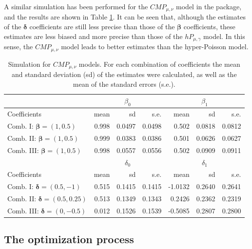 A similar simulation has been performed for the $CMP_{\mu, \nu}$ model in the  package, and the results are shown in Table \ref{tab_simulation_cmp}. It can be seen that, although the estimates of the $\boldsymbol{\delta}$ coefficients are still less precise than those of the $\boldsymbol{\beta}$ coefficients, these estimates are less biased and more precise than those of the $hP_{\mu, \gamma}$ model. In this sense, the $CMP_{\mu, \nu}$ model leads to better estimates than the hyper-Poisson model.

\begin{table}[ht]
\centering
\begin{tabular}{lrrrrrr}
\toprule
  & \multicolumn{3}{c}{$\beta_0$} & \multicolumn{3}{c}{$\beta_1$} \\
  \midrule
  Coefficients & mean & sd & s.e. & mean & sd & s.e. \\
  \midrule
  Comb. I: $\boldsymbol{\beta} = (1,0.5)$   & 0.998 & 0.0497 & 0.0498 & 0.502 & 0.0818 & 0.0812 \\
  Comb. II: $\boldsymbol{\beta} = (1,0.5)$  & 0.999 & 0.0383 & 0.0386 & 0.501 & 0.0626 & 0.0627 \\
  Comb. III: $\boldsymbol{\beta} = (1,0.5)$ & 0.998 & 0.0557 & 0.0556 & 0.502 & 0.0909 & 0.0911 \\
  \midrule
  & \multicolumn{3}{c}{$\delta_0$} & \multicolumn{3}{c}{$\delta_1$} \\
  \midrule
  Coefficients & mean & sd & s.e. & mean & sd & s.e. \\
  \midrule
  Comb. I: $\boldsymbol{\delta} = (0.5,-1)$    & 0.515 & 0.1415 & 0.1415 & -1.0132  & 0.2640 & 0.2641 \\
  Comb. II: $\boldsymbol{\delta} = (0.5,0.25)$ & 0.513 & 0.1349 & 0.1343 & 0.2426  & 0.2362 & 0.2319 \\
  Comb. III: $\boldsymbol{\delta} = (0,-0.5)$  & 0.012 & 0.1526 & 0.1539 & -0.5085 & 0.2807 & 0.2800 \\
   \bottomrule
\end{tabular}
\caption{Simulation for $CMP_{\mu, \nu}$ models. For each combination of coefficients the mean and standard deviation (sd) of the estimates were calculated, as well as the mean of the standard errors (s.e.).}\label{tab_simulation_cmp}
\end{table}

\subsection{The optimization process}

